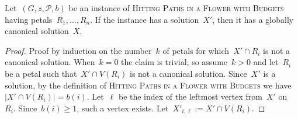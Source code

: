 \let\accentvec\vec  \documentclass{llncs}
\renewcommand{\P}{\ensuremath{\mathcal{P}}\xspace}
\newcommand{\HitPathsInFlower}{\textsc{Hitting Paths in a Flower with Budgets}\xspace}
\begin{document}
\begin{lemma} \label{lemma:existscanonical}
Let~$(G,z,\P,b)$ be an instance of \HitPathsInFlower having petals~$R_1, \ldots, R_n$. If the instance has a solution~$X'$, then it has a globally canonical solution~$X$. \end{lemma}
\begin{proof}
Proof by induction on the number~$k$ of petals for which~$X' \cap R_i$ is not a canonical solution. When~$k=0$ the claim is trivial, so assume~$k > 0$ and let~$R_i$ be a petal such that~$X' \cap V(R_i)$ is not a canonical solution. Since~$X'$ is a solution, by the definition of \HitPathsInFlower we have~$|X' \cap V(R_i)| = b(i)$. Let~$\ell$ be the index of the leftmost vertex from~$X'$ on~$R_i$. Since~$b(i) \geq 1$, such a vertex exists. Let~$X'_{i,\ell} := X' \cap V(R_i)$.


\end{proof}
\end{document}
